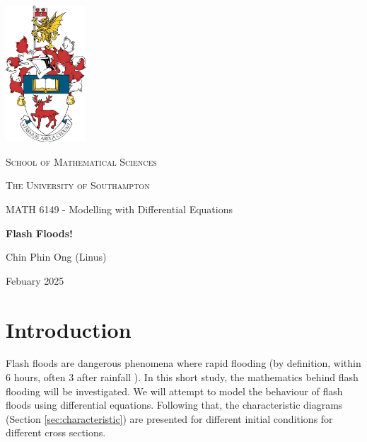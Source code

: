\documentclass[12pt]{article}
\begin{document}
\onehalfspacing
\begin{titlepage}
    \centering
    \includegraphics[width=3cm]{crest.jpg}\par
    \vspace{0.3cm}
    {\scshape\Large School of Mathematical Sciences \par}
    \vspace{0.25cm}
    {\scshape\Large The University of Southampton \par}
    \vspace{0.25cm}
    {\Large MATH 6149 - Modelling with Differential Equations \par}
    \vspace{0.5cm}
    {\huge\bfseries Flash Floods!\par}
    \vspace{0.5cm}

    {\Large Chin Phin Ong (Linus) \par}

    {\large  \par}
    \vfill
    {\large Febuary 2025 \par}
\end{titlepage}

\begin{abstract}
    
\end{abstract}

\section{Introduction}
Flash floods are dangerous phenomena where rapid flooding (by definition, within 6 hours, often 3 after rainfall \cite{national-oceanic-and-atmospheric-administration-no-date}). In this short study, the mathematics behind flash flooding will be investigated. We will attempt to model the behaviour of flash floods using differential equations. Following that, the characteristic diagrams (Section \ref{sec:characteristic}) are presented for different initial conditions for different cross sections.
\end{document}
